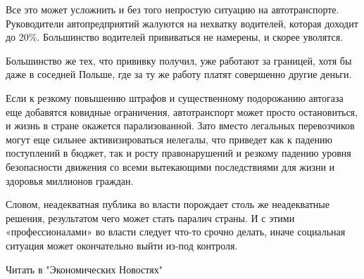 Все это может усложнить и без того непростую ситуацию на автотранспорте.
Руководители автопредприятий жалуются на нехватку водителей, которая доходит до
20\%. Большинство водителей прививаться не намерены, и скорее уволятся.

Большинство же тех, что прививку получил, уже работают за границей, хотя бы
даже в соседней Польше, где за ту же работу платят совершенно другие деньги.

Если к резкому повышению штрафов и существенному подорожанию автогаза еще
добавятся ковидные ограничения, автотранспорт может просто остановиться, и
жизнь в стране окажется парализованной. Зато вместо легальных перевозчиков
могут еще сильнее активизироваться нелегалы, что приведет как к падению
поступлений в бюджет, так и росту правонарушений и резкому падению уровня
безопасности движения со всеми вытекающими последствиями для жизни и здоровья
миллионов граждан.

Словом, неадекватная публика во власти порождает столь же неадекватные решения,
результатом чего может стать паралич страны. И с этими «профессионалами» во
власти следует что-то срочно делать, иначе социальная ситуация может
окончательно выйти из-под контроля.

Читать в "Экономических Новостях"
